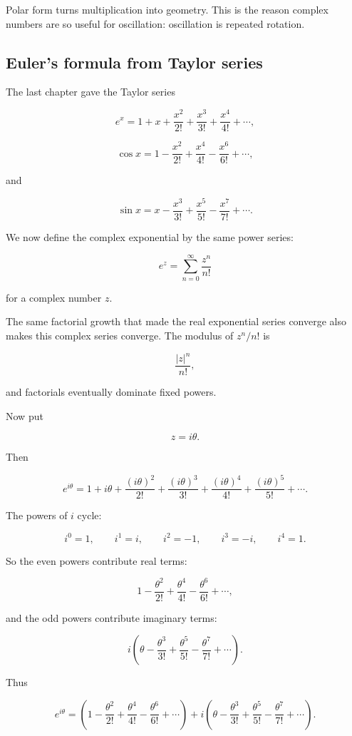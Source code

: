 Polar form turns multiplication into geometry.  This is the reason complex numbers are
so useful for oscillation: oscillation is repeated rotation.

\subsection{Euler's formula from Taylor series}
\label{subsec:euler-formula-from-taylor-series}

The last chapter gave the Taylor series

\[
e^x
=
1+x+\frac{x^2}{2!}+\frac{x^3}{3!}
+\frac{x^4}{4!}+\cdots,
\]

\[
\cos x
=
1-\frac{x^2}{2!}+\frac{x^4}{4!}
-\frac{x^6}{6!}+\cdots,
\]

and

\[
\sin x
=
x-\frac{x^3}{3!}+\frac{x^5}{5!}
-\frac{x^7}{7!}+\cdots.
\]

We now define the complex exponential by the same power series:

\[
\boxed{
e^z=\sum_{n=0}^{\infty}\frac{z^n}{n!}
}
\]

for a complex number \(z\).

The same factorial growth that made the real exponential series converge also makes
this complex series converge.  The modulus of \(z^n/n!\) is

\[
\frac{|z|^n}{n!},
\]

and factorials eventually dominate fixed powers.

Now put

\[
z=i\theta.
\]

Then

\[
e^{i\theta}
=
1+i\theta+\frac{(i\theta)^2}{2!}
+\frac{(i\theta)^3}{3!}
+\frac{(i\theta)^4}{4!}
+\frac{(i\theta)^5}{5!}
+\cdots.
\]

The powers of \(i\) cycle:

\[
i^0=1,
\qquad
i^1=i,
\qquad
i^2=-1,
\qquad
i^3=-i,
\qquad
i^4=1.
\]

So the even powers contribute real terms:

\[
1-\frac{\theta^2}{2!}+\frac{\theta^4}{4!}
-\frac{\theta^6}{6!}+\cdots,
\]

and the odd powers contribute imaginary terms:

\[
i\left(
\theta-\frac{\theta^3}{3!}+\frac{\theta^5}{5!}
-\frac{\theta^7}{7!}+\cdots
\right).
\]

Thus

\[
e^{i\theta}
=
\left(
1-\frac{\theta^2}{2!}+\frac{\theta^4}{4!}
-\frac{\theta^6}{6!}+\cdots
\right)
+
i\left(
\theta-\frac{\theta^3}{3!}+\frac{\theta^5}{5!}
-\frac{\theta^7}{7!}+\cdots
\right).
\]

